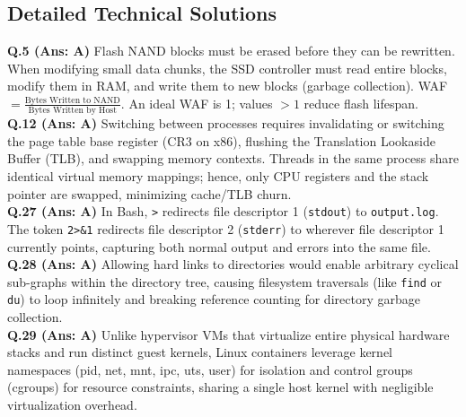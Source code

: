 \subsection*{Detailed Technical Solutions}

\begin{solutionbox}
\textbf{Q.5 (Ans: A)} Flash NAND blocks must be erased before they can be rewritten. When modifying small data chunks, the SSD controller must read entire blocks, modify them in RAM, and write them to new blocks (garbage collection). WAF $= \frac{\text{Bytes Written to NAND}}{\text{Bytes Written by Host}}$. An ideal WAF is 1; values $>1$ reduce flash lifespan.\\[2mm]
\textbf{Q.12 (Ans: A)} Switching between processes requires invalidating or switching the page table base register (CR3 on x86), flushing the Translation Lookaside Buffer (TLB), and swapping memory contexts. Threads in the same process share identical virtual memory mappings; hence, only CPU registers and the stack pointer are swapped, minimizing cache/TLB churn.\\[2mm]
\textbf{Q.27 (Ans: A)} In Bash, \texttt{>} redirects file descriptor 1 (\texttt{stdout}) to \texttt{output.log}. The token \texttt{2>\&1} redirects file descriptor 2 (\texttt{stderr}) to wherever file descriptor 1 currently points, capturing both normal output and errors into the same file.\\[2mm]
\textbf{Q.28 (Ans: A)} Allowing hard links to directories would enable arbitrary cyclical sub-graphs within the directory tree, causing filesystem traversals (like \texttt{find} or \texttt{du}) to loop infinitely and breaking reference counting for directory garbage collection.\\[2mm]
\textbf{Q.29 (Ans: A)} Unlike hypervisor VMs that virtualize entire physical hardware stacks and run distinct guest kernels, Linux containers leverage kernel namespaces (pid, net, mnt, ipc, uts, user) for isolation and control groups (cgroups) for resource constraints, sharing a single host kernel with negligible virtualization overhead.
\end{solutionbox}

\newpage
